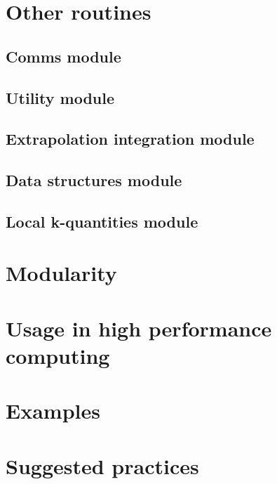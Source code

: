 \documentclass[10pt,a4paper]{article}
\begin{document}
\section{Other routines}
\subsection{Comms module}
\subsection{Utility module}
\subsection{Extrapolation integration module}
\subsection{Data structures module}\label{sec:data_structures}
\subsection{Local k-quantities module}\label{sec:local_k_quantities}
\section{Modularity}\label{sec:modularity}
\section{Usage in high performance computing}
\section{Examples}
\section{Suggested practices}
\nocite{*}


\end{document}
